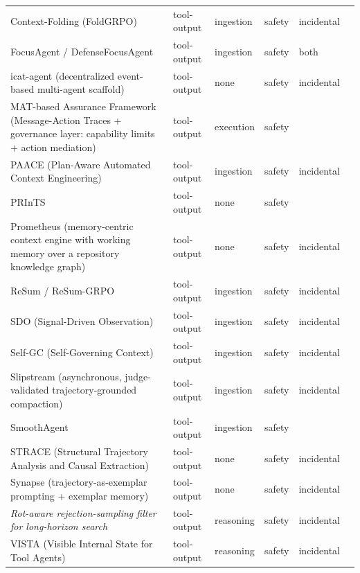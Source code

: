 \begin{longtable}{@{}>{\raggedright\arraybackslash}p{}lllll@{}}
Context-Folding (FoldGRPO) & tool-output & ingestion & safety & incidental & \cite{sun-2025-scaling} \\
FocusAgent / DefenseFocusAgent & tool-output & ingestion & safety & both & \cite{kerboua-2025-focusagent} \\
icat-agent (decentralized event-based multi-agent scaffold) & tool-output & none & safety & incidental & \cite{chen-2026-unlocking} \\
MAT-based Assurance Framework (Message-Action Traces + governance layer: capability limits + action mediation) & tool-output & execution & safety &  & \cite{paduraru-2026-tracebased} \\
PAACE (Plan-Aware Automated Context Engineering) & tool-output & ingestion & safety & incidental & \cite{yuksel-2025-paace} \\
PRInTS & tool-output & none & safety &  & \cite{lee-2025-prints} \\
Prometheus (memory-centric context engine with working memory over a repository knowledge graph) & tool-output & none & safety & incidental & \cite{pan-2025-prometheus} \\
ReSum / ReSum-GRPO & tool-output & ingestion & safety & incidental & \cite{wu-2025-resum} \\
SDO (Signal-Driven Observation) & tool-output & ingestion & safety & incidental & \cite{gaur-2026-signaldriven} \\
Self-GC (Self-Governing Context) & tool-output & ingestion & safety & incidental & \cite{hao-2026-selfgc} \\
Slipstream (asynchronous, judge-validated trajectory-grounded compaction) & tool-output & ingestion & safety & incidental & \cite{chen-2026-slipstream} \\
SmoothAgent & tool-output & ingestion & safety &  & \cite{pan-2026-smoothagent} \\
STRACE (Structural Trajectory Analysis and Causal Extraction) & tool-output & none & safety & incidental & \cite{chang-2026-noisy} \\
Synapse (trajectory-as-exemplar prompting + exemplar memory) & tool-output & none & safety & incidental & \cite{zheng-2023-synapse} \\
\emph{Rot-aware rejection-sampling filter for long-horizon search} & tool-output & reasoning & safety & incidental & \cite{xia-2026-diagnosing} \\
VISTA (Visible Internal State for Tool Agents) & tool-output & reasoning & safety & incidental & \cite{xu-2026-llm} \\

\end{longtable}
